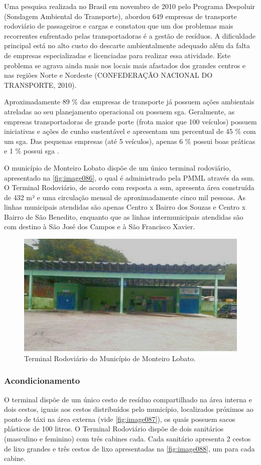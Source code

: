 Uma pesquisa realizada no Brasil em novembro de 2010 pelo Programa Despoluir (Sondagem Ambiental do Transporte), abordou 649 empresas de transporte rodoviário de passageiros e cargas e constatou que um dos problemas mais recorrentes enfrentado pelas transportadoras é a gestão de resíduos. A dificuldade principal está no alto custo do descarte ambientalmente adequado além da falta de empresas especializadas e licenciadas para realizar essa atividade. Este problema se agrava ainda mais nos locais mais afastados dos grandes centros e nas regiões Norte e Nordeste (CONFEDERAÇÃO NACIONAL DO TRANSPORTE, 2010).

Aproximadamente 89 \% das empresas de transporte já possuem ações ambientais atreladas ao seu planejamento operacional ou possuem \gls{sga}. Geralmente, as empresas transportadoras de grande porte (frota maior que 100 veículos) possuem iniciativas e ações de cunho sustentável e apresentam um percentual de 45 \% com um \gls{sga}. Das pequenas empresas (até 5 veículos), apenas 6 \% possui boas práticas e 1 \% possui \gls{sga} \cite{Paixao2011}.

O município de Monteiro Lobato dispõe de um único terminal rodoviário, apresentado na \autoref{fig:image086}, o qual é administrado pela PMML através da \gls{ssm}. O Terminal Rodoviário, de acordo com resposta a \gls{ssm}, apresenta área construída de 432 m² e uma circulação mensal de aproximadamente cinco mil pessoas. As linhas municipais atendidas são apenas Centro x Bairro dos Souzas e Centro x Bairro de São Benedito, enquanto que as linhas intermunicipais atendidas são com destino à São José dos Campos e à São Francisco Xavier.

\begin{figure}
	\centering
	\includegraphics[width=0.7\linewidth]{produtos/prodtres/image086}
	\caption{Terminal Rodoviário do Município de Monteiro Lobato.}
	\label{fig:image086}
\end{figure}


\subsubsection{Acondicionamento}
O terminal dispõe de um único cesto de resíduo compartilhado na área interna e dois cestos, iguais aos cestos distribuídos pelo município, localizados próximos ao ponto de táxi na área externa (vide \autoref{fig:image087}), os quais possuem sacos plásticos de 100 litros. O Terminal Rodoviário dispõe de dois sanitários (masculino e feminino) com três cabines cada. Cada sanitário apresenta 2 cestos de lixo grandes e três cestos de lixo apresentadas na \autoref{fig:image088}, um para cada cabine.

